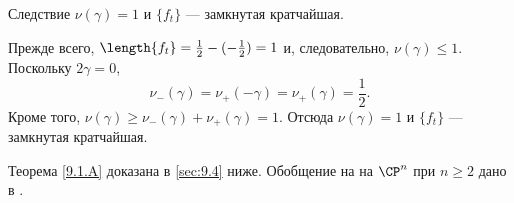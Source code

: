 \begin{thm}[(\cite{LM2})]{Следствие} $\nu(\gamma) = 1$ и $\{f_t\}$ --- замкнутая кратчайшая.
\end{thm}

Прежде всего, $\length\{f_t\} =\frac12 - (-\frac12 ) = 1$ и, следовательно, $\nu(\gamma) \le 1$.
Поскольку $2\gamma = 0$, 
\[\nu_- (\gamma) = \nu_+ (-\gamma) = \nu_+ (\gamma) =\frac12.\]
Кроме того, $\nu(\gamma) \ge \nu_- (\gamma) + \nu_+ (\gamma) = 1$.
Отсюда $\nu(\gamma) = 1$ и $\{f_t\}$ --- замкнутая кратчайшая.

Теорема \ref{9.1.A} доказана в \ref{sec:9.4} ниже.
Обобщение на на $\CP^n$ при $n \ge 2$ дано в \cite{P3}.
